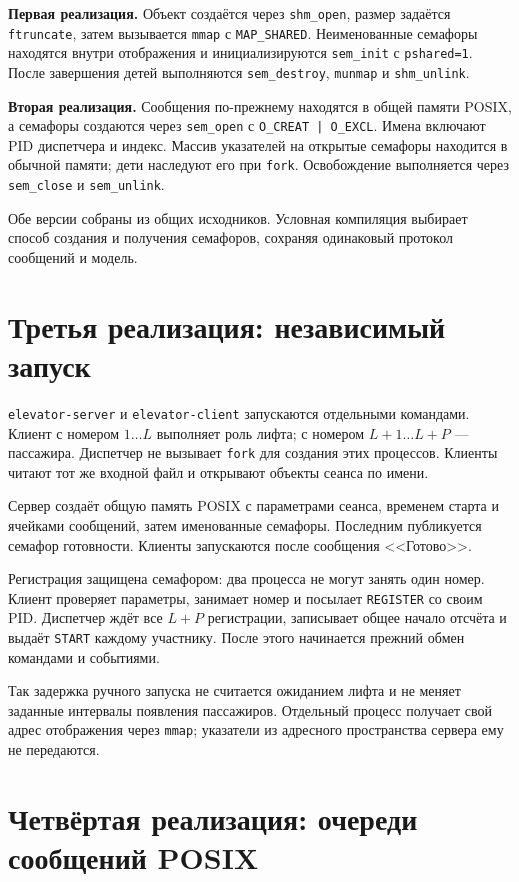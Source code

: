 \documentclass[12pt,a4paper]{article}
\begin{document}
\textbf{Первая реализация.} Объект создаётся через \verb|shm_open|,
размер задаётся \verb|ftruncate|, затем вызывается \verb|mmap| с
\verb|MAP_SHARED|. Неименованные семафоры находятся внутри отображения
и инициализируются \verb|sem_init| с \verb|pshared=1|. После завершения
детей выполняются \verb|sem_destroy|, \verb|munmap| и \verb|shm_unlink|.

\textbf{Вторая реализация.} Сообщения по-прежнему находятся в общей
памяти POSIX, а семафоры создаются через \verb|sem_open| с
\verb+O_CREAT | O_EXCL+. Имена включают PID диспетчера и индекс.
Массив указателей на открытые семафоры находится в обычной памяти;
дети наследуют его при \verb|fork|. Освобождение выполняется через
\verb|sem_close| и \verb|sem_unlink|.

Обе версии собраны из общих исходников. Условная компиляция выбирает
способ создания и получения семафоров, сохраняя одинаковый протокол
сообщений и модель.

\section{Третья реализация: независимый запуск}

\verb|elevator-server| и \verb|elevator-client| запускаются отдельными
командами. Клиент с номером $1\ldots L$ выполняет роль лифта; с номером
$L+1\ldots L+P$ --- пассажира. Диспетчер не вызывает \verb|fork| для
создания этих процессов. Клиенты читают тот же входной файл и открывают
объекты сеанса по имени.

Сервер создаёт общую память POSIX с параметрами сеанса, временем старта
и ячейками сообщений, затем именованные семафоры. Последним публикуется
семафор готовности. Клиенты запускаются после сообщения <<Готово>>.

Регистрация защищена семафором: два процесса не могут занять один
номер. Клиент проверяет параметры, занимает номер и посылает
\verb|REGISTER| со своим PID. Диспетчер ждёт все $L+P$ регистрации,
записывает общее начало отсчёта и выдаёт \verb|START| каждому участнику.
После этого начинается прежний обмен командами и событиями.

Так задержка ручного запуска не считается ожиданием лифта и не меняет
заданные интервалы появления пассажиров. Отдельный процесс получает
свой адрес отображения через \verb|mmap|; указатели из адресного
пространства сервера ему не передаются.

\section{Четвёртая реализация: очереди сообщений POSIX}
\end{document}
